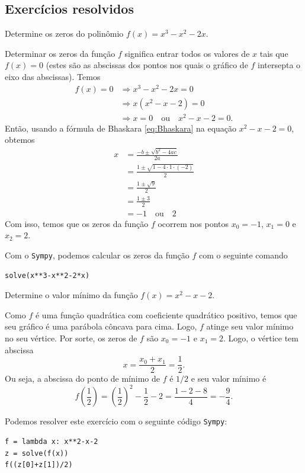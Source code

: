 \subsection*{Exercícios resolvidos}

\begin{exeresol}
  Determine os zeros do polinômio $f(x) = x^3-x^2-2x$.
\end{exeresol}
\begin{resol}
  Determinar os zeros da função $f$ significa entrar todos os valores de $x$ tais que $f(x)=0$ (estes são as abscissas dos pontos nos quais o gráfico de $f$ intersepta o eixo das abscissas). Temos
  \begin{align}
    f(x)=0 &\Rightarrow x^3-x^2-2x=0\\
           &\Rightarrow x(x^2-x-2)=0\\
           &\Rightarrow x=0\quad\text{ou}\quad x^2-x-2=0.
  \end{align}
  Então, usando a fórmula de Bhaskara \eqref{eq:Bhaskara} na equação $x^2-x-2=0$, obtemos
  \begin{align}
    x &= \frac{-b\pm\sqrt{b^2-4ac}}{2a} \\
      &= \frac{1\pm\sqrt{1-4\cdot 1\cdot (-2)}}{2}\\
      &= \frac{1\pm\sqrt{9}}{2}\\
      &= \frac{1\pm 3}{2}\\
      &= -1\quad\text{ou}\quad 2
  \end{align}
  Com isso, temos que os zeros da função $f$ ocorrem nos pontos $x_0 = -1$, $x_1=0$ e $x_2=2$.

  \ifispython
  Com o \verb+Sympy+, podemos calcular os zeros da função $f$ com o seguinte comando
\begin{verbatim}
solve(x**3-x**2-2*x)
\end{verbatim}
  \fi
\end{resol}

\begin{exeresol}
  Determine o valor mínimo da função $f(x) = x^2 - x - 2$.
\end{exeresol}
\begin{resol}
  Como $f$ é uma função quadrática com coeficiente quadrático positivo, temos que seu gráfico é uma parábola côncava para cima. Logo, $f$ atinge seu valor mínimo no seu vértice. Por sorte, os zeros de $f$ são $x_0 = -1$ e $x_1 = 2$. Logo, o vértice tem abscissa
  \begin{equation}
    x = \frac{x_0 + x_1}{2} = \frac{1}{2}.
  \end{equation}
  Ou seja, a abscissa do ponto de mínimo de $f$ é $1/2$ e seu valor mínimo é
  \begin{equation}
    f\left(\frac{1}{2}\right) = \left(\frac{1}{2}\right)^2-\frac{1}{2}-2 = \frac{1-2-8}{4} = -\frac{9}{4}.
  \end{equation}

  \ifispython
  Podemos resolver este exercício com o seguinte código \verb+Sympy+:
\begin{verbatim}
f = lambda x: x**2-x-2
z = solve(f(x))
f((z[0]+z[1])/2)
\end{verbatim}
  \fi
\end{resol}

